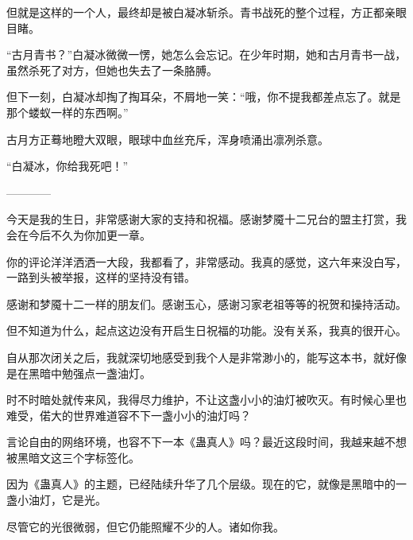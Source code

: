 \begin{this_body}
但就是这样的一个人，最终却是被白凝冰斩杀。青书战死的整个过程，方正都亲眼目睹。

“古月青书？”白凝冰微微一愣，她怎么会忘记。在少年时期，她和古月青书一战，虽然杀死了对方，但她也失去了一条胳膊。

但下一刻，白凝冰却掏了掏耳朵，不屑地一笑：“哦，你不提我都差点忘了。就是那个蝼蚁一样的东西啊。”

古月方正蓦地瞪大双眼，眼球中血丝充斥，浑身喷涌出凛冽杀意。

“白凝冰，你给我死吧！”

------------

\end{this_body}


\begin{this_body} %

今天是我的生日，非常感谢大家的支持和祝福。感谢梦魇十二兄台的盟主打赏，我会在今后不久为你加更一章。

你的评论洋洋洒洒一大段，我都看了，非常感动。我真的感觉，这六年来没白写，一路到头被举报，这样的坚持没有错。

感谢和梦魇十二一样的朋友们。感谢玉心，感谢习家老祖等等的祝贺和操持活动。

但不知道为什么，起点这边没有开启生日祝福的功能。没有关系，我真的很开心。

自从那次闭关之后，我就深切地感受到我个人是非常渺小的，能写这本书，就好像是在黑暗中勉强点一盏油灯。

时不时暗处就传来风，我得尽力维护，不让这盏小小的油灯被吹灭。有时候心里也难受，偌大的世界难道容不下一盏小小的油灯吗？

言论自由的网络环境，也容不下一本《蛊真人》吗？最近这段时间，我越来越不想被黑暗文这三个字标签化。

因为《蛊真人》的主题，已经陆续升华了几个层级。现在的它，就像是黑暗中的一盏小油灯，它是光。

尽管它的光很微弱，但它仍能照耀不少的人。诸如你我。

\end{this_body}

